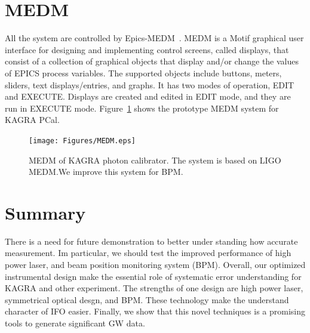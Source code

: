 \section{MEDM} \label{MEDM}
All the system are controlled by Epics-MEDM~\cite{MEDM}. 
MEDM is a Motif graphical user interface for designing and implementing control screens, called displays, that consist of a collection of graphical objects that display and/or change the values of EPICS process variables. The supported objects include buttons, meters, sliders, text displays/entries, and graphs. It has two modes of operation, EDIT and EXECUTE. Displays are created and edited in EDIT mode, and they are run in EXECUTE mode.
Figure~\ref{fig:MEDM} shows the prototype MEDM system for KAGRA PCal.
\begin{figure}
\begin{center}
\texttt{[image: Figures/MEDM.eps]}
\caption{MEDM of KAGRA photon calibrator. The system is based on LIGO MEDM.We improve this system for BPM.}
\label{fig:MEDM} 
\end{center}
\end{figure}

\section{Summary}
There is a need for future demonstration to better under standing how accurate measurement.
Im particular, we should test the improved performance of high power laser, and  beam position monitoring system (BPM).
Overall, our optimized instrumental design make the essential role of systematic error understanding for KAGRA and other experiment.
The strengths of one design are high power laser, symmetrical optical desgn, and BPM.
These technology make the understand character of IFO easier.
Finally, we show that this novel techniques is a promising tools to generate significant GW data.
